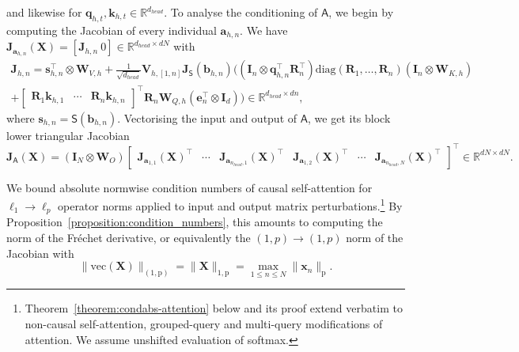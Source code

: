 \documentclass[namedate,webpdf,imanum]{ima-authoring-template}
\newcommand{\Real}{\mathbb{R}}
\newcommand{\Matrix}[1]{\mathbf{#1}}
\newcommand{\trans}{\intercal}
\newcommand{\diag}[2][]{\mathrm{diag}#1( #2 #1)}
\newcommand{\Norm}[3][]{#1\| #2 #1\|_{\mathrm{#3}}}
\newcommand{\krp}{\mathbin{\otimes}}
\newcommand{\vect}{\mathrm{vec}}
\newcommand{\Vect}[2][]{\vect#1( #2 #1)}
\newcommand{\Layer}[1]{\mathsf{#1}}
\numberwithin{equation}{section}
\begin{document}
and likewise for $\Matrix{q}_{h,t}, \Matrix{k}_{h,t} \in \Real^{d_{head}}$.
To analyse the conditioning of $\Layer{A}$, we begin by computing the Jacobian of every individual $\Matrix{a}_{h,n}$.
We have $\Matrix{J}_{\Matrix{a}_{h,n}}(\Matrix{X}) = [\Matrix{\Matrix{J}}_{h,n}~0] \in \Real^{d_{head} \times dN}$ with
\begin{multline*}
    \Matrix{\Matrix{J}}_{h,n} = \Matrix{s}_{h,n}^\trans \krp \Matrix{W}_{V,h} + \tfrac{1}{\sqrt{d_{head}}} \Matrix{V}_{h,[1,n]} \Matrix{J}_{\Layer{S}}(\Matrix{b}_{h,n}) \Big( (\Matrix{I}_n \krp \Matrix{q}_{h,n}^\trans \Matrix{R}_n^\trans) \diag{\Matrix{R}_1, \ldots, \Matrix{R}_n} (\Matrix{I}_n \krp \Matrix{W}_{K,h}) \\
    + \begin{bmatrix}
        \Matrix{R}_{1}\Matrix{k}_{h,1} & \cdots & \Matrix{R}_{n}\Matrix{k}_{h,n}
    \end{bmatrix}^\trans \Matrix{R}_n \Matrix{W}_{Q,h} (\Matrix{e}_n^\trans \krp \Matrix{I}_d) \Big) \in \Real^{d_{head} \times dn},
\end{multline*}
where $\Matrix{s}_{h,n} = \Layer{S}(\Matrix{b}_{h,n})$.
Vectorising the input and output of $\Layer{A}$, we get its block lower triangular Jacobian
\begin{equation*}
    \Matrix{J}_{\Layer{A}}(\Matrix{X}) = (\Matrix{I}_N \krp \Matrix{W}_{O}) 
    \begin{bmatrix}
        \Matrix{J}_{\Matrix{a}_{1,1}}(\Matrix{X})^\trans & \cdots & \Matrix{J}_{\Matrix{a}_{n_{head},1}}(\Matrix{X})^\trans & \Matrix{J}_{\Matrix{a}_{1,2}}(\Matrix{X})^\trans & \cdots & \Matrix{J}_{\Matrix{a}_{n_{head},N}}(\Matrix{X})^\trans
    \end{bmatrix}^\trans \in \Real^{dN \times dN}.
\end{equation*}

We bound absolute normwise condition numbers of causal self-attention for $\ell_1 \to \ell_p$ operator norms applied to input and output matrix perturbations.\footnote{Theorem~\ref{theorem:condabs-attention} below and its proof extend verbatim to non-causal self-attention, grouped-query and multi-query modifications of attention. We assume unshifted evaluation of softmax.}
By Proposition~\ref{proposition:condition_numbers}, this amounts to computing the norm of the Fr\'echet derivative, or equivalently the $(1,p) \to (1,p)$ norm of the Jacobian with
\begin{equation*}
    \Norm{\Vect{\Matrix{X}}}{(1,p)} = \Norm{\Matrix{X}}{1,p} = \max_{1 \leq n \leq N} \Norm{\Matrix{x}_n}{p}.
\end{equation*}
\end{document}

